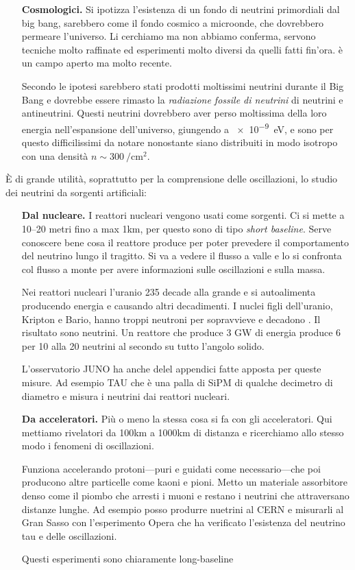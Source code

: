 \begin{enumerate}
                \item[\textbf{Cosmologici.}] Si ipotizza l'esistenza di un fondo di neutrini primordiali dal big bang, sarebbero come il fondo cosmico a microonde, che dovrebbero permeare l'universo. Li cerchiamo ma non abbiamo conferma, servono tecniche molto raffinate ed esperimenti molto diversi da quelli fatti fin'ora. è un campo aperto ma molto recente.
                 
                Secondo le ipotesi sarebbero stati prodotti moltissimi neutrini durante il Big Bang e dovrebbe essere rimasto la \emph{radiazione fossile di neutrini} di neutrini e antineutrini. Questi neutrini dovrebbero aver perso moltissima della loro energia nell'espansione dell'universo, giungendo a \SI{e-9}{\eV}, e sono per questo difficilissimi da notare nonostante siano distribuiti in modo isotropo con una densità $n \sim \SI{300}{\per\centi\meter\squared}$.
            \end{enumerate}
            È di grande utilità, soprattutto per la comprensione delle oscillazioni, lo studio dei neutrini da sorgenti artificiali:
            \begin{enumerate}
                \item[\textbf{Dal nucleare.}] I reattori nucleari vengono usati come sorgenti. Ci si mette a 10--20 metri fino a max 1km, per questo sono di tipo \textit{short baseline}. Serve conoscere bene cosa il reattore produce per poter prevedere il comportamento del neutrino lungo il tragitto. Si va a vedere il flusso a valle e lo si confronta col flusso a monte per avere informazioni sulle oscillazioni e sulla massa.
                
                Nei reattori nucleari l'uranio 235 decade alla grande e si autoalimenta producendo energia e causando altri decadimenti. I nuclei figli dell'uranio, Kripton e Bario, hanno troppi neutroni per sopravvieve e decadono \betap. Il risultato sono neutrini. Un reattore che produce 3 GW di energia produce 6 per 10 alla 20 neutrini al secondo su tutto l'angolo solido.

                L'osservatorio JUNO ha anche delel appendici fatte apposta per queste misure. Ad esempio TAU che è una palla di SiPM di qualche decimetro di diametro e misura i neutrini dai reattori nucleari.
                
                \item[\textbf{Da acceleratori.}] Più o meno la stessa cosa si fa con gli acceleratori. Qui mettiamo rivelatori da 100km a 1000km di distanza e ricerchiamo allo stesso modo i fenomeni di oscillazioni.
                
                Funziona accelerando protoni---puri e guidati come necessario---che poi producono altre particelle come kaoni e pioni. Metto un materiale assorbitore denso come il piombo che arresti i muoni e restano i neutrini che attraversano distanze lunghe. Ad esempio posso produrre nuetrini al CERN e misurarli al Gran Sasso con l'esperimento Opera che ha verificato l'esistenza del neutrino tau e delle oscillazioni.

                Questi esperimenti sono chiaramente long-baseline
            \end{enumerate}
                
